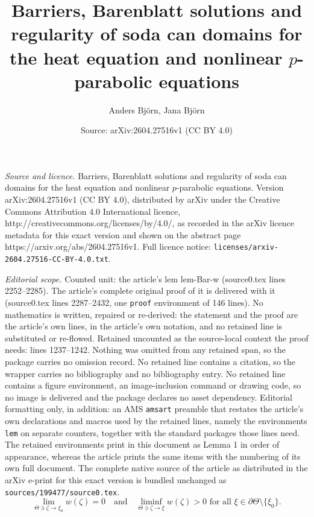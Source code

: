 \documentclass[10pt,a4paper]{amsart}
\title{Barriers, Barenblatt solutions and regularity of soda can domains for the heat equation and nonlinear $p$-parabolic equations}
\author{Anders Bj\"orn, Jana Bj\"orn}
\date{Source: arXiv:2604.27516v1 (CC BY 4.0)}
\newcommand{\bdy}{\partial}
\newcommand{\setm}{\setminus}
\begin{document}
\maketitle

\noindent\emph{Source and licence.} Barriers, Barenblatt solutions and regularity of soda can domains for the heat equation and nonlinear $p$-parabolic equations. Version arXiv:2604.27516v1 (CC BY 4.0), distributed by arXiv under the Creative Commons Attribution 4.0 International licence, http://creativecommons.org/licenses/by/4.0/, as recorded in the arXiv licence metadata for this exact version and shown on the abstract page https://arxiv.org/abs/2604.27516v1. Full licence notice: \texttt{licenses/arxiv-2604.27516-CC-BY-4.0.txt}.\par\smallskip

\noindent\textit{Editorial scope.} Counted unit: the article's lem lem-Bar-w (source0.tex lines 2252--2285). The article's complete original proof of it is delivered with it (source0.tex lines 2287--2432, one \texttt{proof} environment of 146 lines). No mathematics is written, repaired or re-derived: the statement and the proof are the article's own lines, in the article's own notation, and no retained line is substituted or re-flowed.  Retained uncounted as the source-local context the proof needs: lines 1237--1242.  Nothing was omitted from any retained span, so the package carries no omission record.  No retained line contains a citation, so the wrapper carries no bibliography and no bibliography entry.  No retained line contains a figure environment, an image-inclusion command or drawing code, so no image is delivered and the package declares no asset dependency.  Editorial formatting only, in addition: an AMS \texttt{amsart} preamble that restates the article's own declarations and macros used by the retained lines, namely the environments \texttt{lem} on separate counters, together with the standard packages those lines need.  The retained environments print in this document as Lemma 1 in order of appearance, whereas the article prints the same items with the numbering of its own full document.  The complete native source of the article as distributed in the arXiv e-print for this exact version is bundled unchanged as \texttt{sources/199477/source0.tex}.
\begin{equation} \label{eq-trad-barrier} 
\lim_{\Theta \ni \zeta\to \xi_0} w(\zeta)=0 
   \quad \text{and} \quad
  \liminf_{\Theta \ni\zeta\to \xi} w(\zeta)>0
   \text{ for all } \xi \in \bdy \Theta \setm \{\xi_0\}.
\end{equation}
\end{document}
